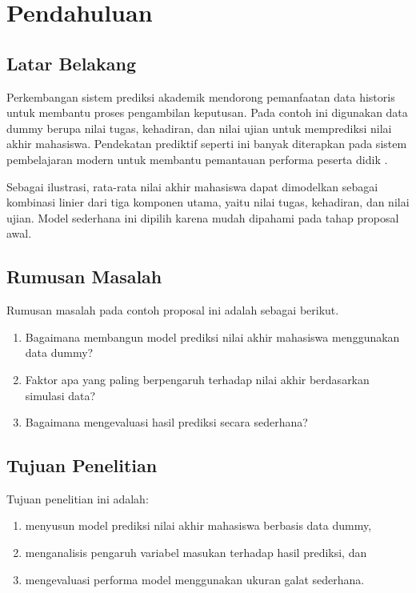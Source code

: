 \documentclass[proposal]{unnes-ta_plus}
\begin{document}
\unnesFrontMatter

\maketitleunnes
\unnesPersetujuanPembimbing
\tableofcontents
\clearpage

\unnesMainMatter

\chapter{Pendahuluan}
\section{Latar Belakang}
Perkembangan sistem prediksi akademik mendorong pemanfaatan data historis untuk membantu proses pengambilan keputusan. Pada contoh ini digunakan data dummy berupa nilai tugas, kehadiran, dan nilai ujian untuk memprediksi nilai akhir mahasiswa. Pendekatan prediktif seperti ini banyak diterapkan pada sistem pembelajaran modern untuk membantu pemantauan performa peserta didik \cite{ahmad2022,pratama2023}.

Sebagai ilustrasi, rata-rata nilai akhir mahasiswa dapat dimodelkan sebagai kombinasi linier dari tiga komponen utama, yaitu nilai tugas, kehadiran, dan nilai ujian. Model sederhana ini dipilih karena mudah dipahami pada tahap proposal awal.

\section{Rumusan Masalah}
Rumusan masalah pada contoh proposal ini adalah sebagai berikut.
\begin{enumerate}
    \item Bagaimana membangun model prediksi nilai akhir mahasiswa menggunakan data dummy?
    \item Faktor apa yang paling berpengaruh terhadap nilai akhir berdasarkan simulasi data?
    \item Bagaimana mengevaluasi hasil prediksi secara sederhana?
\end{enumerate}

\section{Tujuan Penelitian}
Tujuan penelitian ini adalah:
\begin{enumerate}
    \item menyusun model prediksi nilai akhir mahasiswa berbasis data dummy,
    \item menganalisis pengaruh variabel masukan terhadap hasil prediksi, dan
    \item mengevaluasi performa model menggunakan ukuran galat sederhana.
\end{enumerate}
\end{document}
